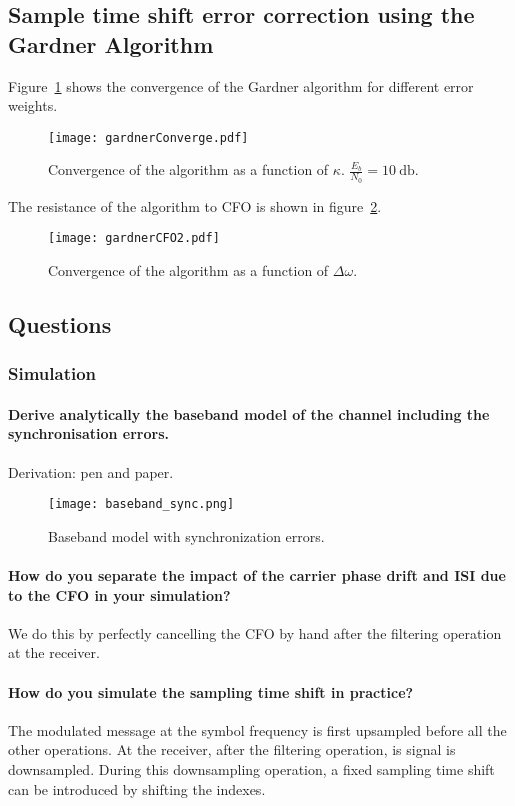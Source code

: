 \subsection{Sample time shift error correction using the Gardner Algorithm}
Figure~\ref{fig:gConvK} shows the convergence of the Gardner algorithm for different error weights.
\begin{figure}[htbp]
    \centering
    \texttt{[image: gardnerConverge.pdf]}
    \caption{Convergence of the algorithm as a function of $\kappa$. $\frac{E_b}{N_0} = \SI{10}{\decibel}$.\label{fig:gConvK}}
\end{figure}
The resistance of the algorithm to CFO is shown in figure~\ref{fig:gConvCFO}.
\begin{figure}[htbp]
    \centering
    \texttt{[image: gardnerCFO2.pdf]}
    \caption{Convergence of the algorithm as a function of $\Delta\omega$.\label{fig:gConvCFO}}
\end{figure}

\subsection{Questions}
\subsubsection{Simulation}

\paragraph{Derive analytically the baseband model of the channel including the synchronisation errors.}
Derivation: pen and paper.
\begin{figure}[htbp]
\texttt{[image: baseband\_sync.png]}
\caption{Baseband model with synchronization errors.\label{fig:sync}}
\end{figure}


\paragraph{How do you separate the impact of the carrier phase drift and ISI due to the CFO in your simulation?}
We do this by perfectly cancelling the CFO by hand after the filtering operation at the receiver.

\paragraph{How do you simulate the sampling time shift in practice?}The modulated message at the symbol frequency is first upsampled before all the other operations.
At the receiver, after the filtering operation, is signal is downsampled.
During this downsampling operation, a fixed sampling time shift can be introduced by shifting the indexes.

